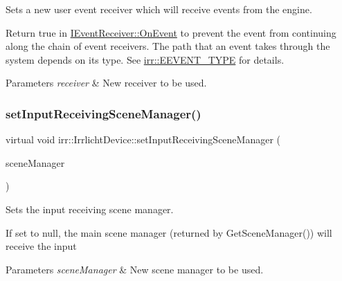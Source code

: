 Sets a new user event receiver which will receive events from the engine. 

Return true in \hyperlink{classirr_1_1IEventReceiver_a571f744ceffc3b4fe8a81f529163eb97}{I\+Event\+Receiver\+::\+On\+Event} to prevent the event from continuing along the chain of event receivers. The path that an event takes through the system depends on its type. See \hyperlink{namespaceirr_ac9eed96e06e85ce3c86fcbbbe9e48a0c}{irr\+::\+E\+E\+V\+E\+N\+T\+\_\+\+T\+Y\+PE} for details. 
\begin{DoxyParams}{Parameters}
{\em receiver} & New receiver to be used. \\
\hline
\end{DoxyParams}
\mbox{\label{classirr_1_1IrrlichtDevice_a22ab84f23050dbef122f16a33aa9b91d}} 
\subsubsection{\texorpdfstring{set\+Input\+Receiving\+Scene\+Manager()}{setInputReceivingSceneManager()}\hspace{0.1cm}{\footnotesize\ttfamily [1/2]}}
{\footnotesize\ttfamily virtual void irr\+::\+Irrlicht\+Device\+::set\+Input\+Receiving\+Scene\+Manager (\begin{DoxyParamCaption}\item[{\hyperlink{classirr_1_1scene_1_1ISceneManager}{scene\+::\+I\+Scene\+Manager} $\ast$}]{scene\+Manager }\end{DoxyParamCaption})\hspace{0.3cm}{\ttfamily [pure virtual]}}



Sets the input receiving scene manager. 

If set to null, the main scene manager (returned by Get\+Scene\+Manager()) will receive the input 
\begin{DoxyParams}{Parameters}
{\em scene\+Manager} & New scene manager to be used. \\
\hline
\end{DoxyParams}
\mbox{\label{classirr_1_1IrrlichtDevice_a22ab84f23050dbef122f16a33aa9b91d}} 
